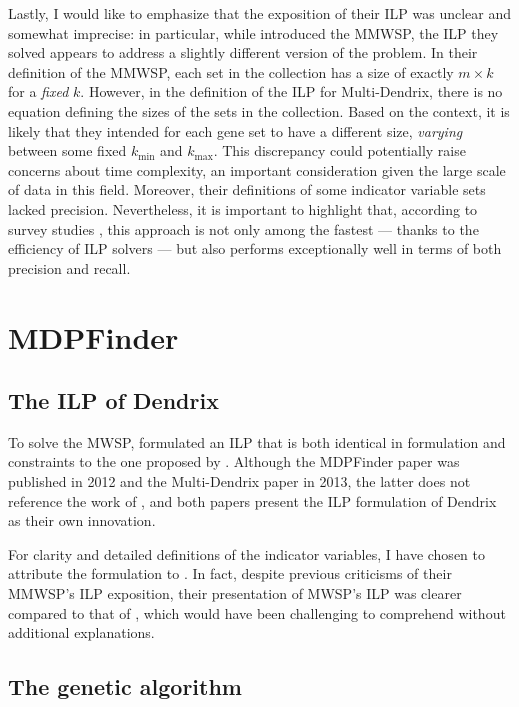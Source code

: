 Lastly, I would like to emphasize that the exposition of their ILP was unclear and somewhat imprecise: in particular, while \textcite{multi-dendrix} introduced the MMWSP, the ILP they solved appears to address a slightly different version of the problem. In their definition of the MMWSP, each set in the collection has a size of exactly $m \times k$ for a \textit{fixed} $k$. However, in the definition of the ILP for Multi-Dendrix, there is no equation defining the sizes of the sets in the collection. Based on the context, it is likely that they intended for each gene set to have a different size, \textit{varying} between some fixed $k_\mathrm{min}$ and $k_\mathrm{max}$. This discrepancy could potentially raise concerns about time complexity, an important consideration given the large scale of data in this field. Moreover, their definitions of some indicator variable sets lacked precision. Nevertheless, it is important to highlight that, according to survey studies \cite{survey}, this approach is not only among the fastest --- thanks to the efficiency of ILP solvers --- but also performs exceptionally well in terms of both precision and recall.

\section{MDPFinder}

\subsection{The ILP of Dendrix}

To solve the MWSP, \textcite{mdpfinder} formulated an ILP that is both identical in formulation and constraints to the one proposed by \textcite{multi-dendrix}. Although the MDPFinder paper was published in 2012 and the Multi-Dendrix paper in 2013, the latter does not reference the work of \textcite{mdpfinder}, and both papers present the ILP formulation of Dendrix as their own innovation.

For clarity and detailed definitions of the indicator variables, I have chosen to attribute the formulation to \textcite{multi-dendrix}. In fact, despite previous criticisms of their MMWSP's ILP exposition, their presentation of MWSP's ILP was clearer compared to that of \textcite{mdpfinder}, which would have been challenging to comprehend without additional explanations.

\subsection{The genetic algorithm}

